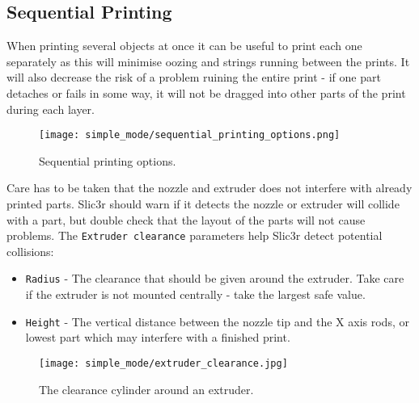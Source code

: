 
\subsection{Sequential Printing} %
\label{sec:sequential_printing}

When printing several objects at once it can be useful to print each one separately as this will minimise oozing and strings running between the prints.  It will also decrease the risk of a problem ruining the entire print - if one part detaches or fails in some way, it will not be dragged into other parts of the print during each layer.

\begin{figure}[H]
\centering
\texttt{[image: simple\_mode/sequential\_printing\_options.png]}
\caption{Sequential printing options.}
\label{fig:sequential_printing_options}
\end{figure}

Care has to be taken that the nozzle and extruder does not interfere with already printed parts.  Slic3r should warn if it detects the nozzle or extruder will collide with a part, but double check that the layout of the parts will not cause problems.  The \texttt{Extruder clearance} parameters help Slic3r detect potential collisions:
\begin{itemize}
	\item \texttt{Radius}  - The clearance that should be given around the extruder.  Take care if the extruder is not mounted centrally - take the largest safe value.
	\item \texttt{Height}  - The vertical distance between the nozzle tip and the X axis rods, or lowest part which may interfere with a finished print.
\end{itemize}

\begin{figure}[H]
\centering
\texttt{[image: simple\_mode/extruder\_clearance.jpg]}
\caption{The clearance cylinder around an extruder.}
\label{fig:a_diagram_depicting_extruder_clearance}
\end{figure}

